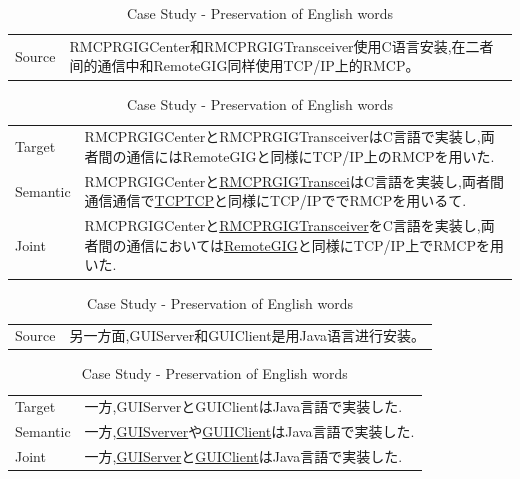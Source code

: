 \vspace{0.4cm}
\begin{table}[h]
    \centering

    \begin{CJK}{UTF8}{gbsn}
        \begin{tabularx}{\textwidth}{p{1.2cm}b}\toprule
            Source & RMCPRGIGCenter和RMCPRGIGTransceiver使用C语言安装,在二者间的通信中和RemoteGIG同样使用TCP/IP上的RMCP。 \\
        \end{tabularx}
    \end{CJK}

    \begin{CJK}{UTF8}{long}
        \begin{tabularx}{\textwidth}{p{1.2cm}b}
            Target & RMCPRGIGCenterとRMCPRGIGTransceiverはC言語で実装し,両者間の通信にはRemoteGIGと同様にTCP/IP上のRMCPを用いた. \\
            Semantic & RMCPRGIGCenterと\underline{RMCPRGIGTranscei}はC言語を実装し,両者間通信通信で\underline{TCPTCP}と同様にTCP/IPででRMCPを用いるて. \\
            Joint & RMCPRGIGCenterと\underline{RMCPRGIGTransceiver}をC言語を実装し,両者間の通信においては\underline{RemoteGIG}と同様にTCP/IP上でRMCPを用いた. \\\midrule
        \end{tabularx}
    \end{CJK}

    \begin{CJK}{UTF8}{gbsn}
        \begin{tabularx}{\textwidth}{p{1.2cm}b}
            Source & 另一方面,GUIServer和GUIClient是用Java语言进行安装。 \\
        \end{tabularx}
    \end{CJK}

    \begin{CJK}{UTF8}{long}
        \begin{tabularx}{\textwidth}{p{1.2cm}b}
            Target & 一方,GUIServerとGUIClientはJava言語で実装した. \\
            Semantic & 一方,\underline{GUISverver}や\underline{GUIIClient}はJava言語で実装した. \\
            Joint & 一方,\underline{GUIServer}と\underline{GUIClient}はJava言語で実装した. \\\midrule
        \end{tabularx}
    \end{CJK}

    \caption{Case Study - Preservation of English words}
    \label{tab:case_study3}
\end{table}

